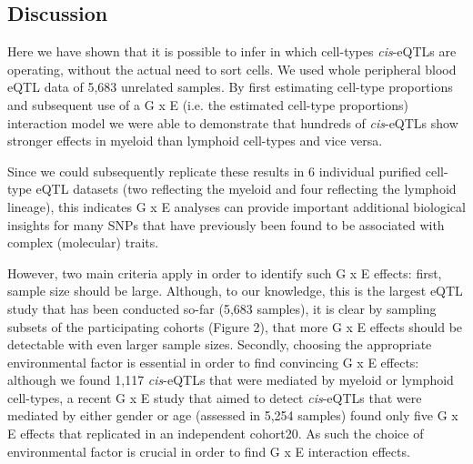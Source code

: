  \subsection{Discussion}
  Here we have shown that it is possible to infer in which cell-types \emph{cis}-eQTLs are operating, without 
  the actual need to sort cells. We used whole peripheral blood eQTL data of 5,683 unrelated samples. 
  By first estimating cell-type proportions and subsequent use of a G x E (i.e. the estimated cell-type 
  proportions) interaction model we were able to demonstrate that hundreds of \emph{cis}-eQTLs show stronger 
  effects in myeloid than lymphoid cell-types and vice versa. 

  Since we could subsequently replicate these results in 6 individual purified cell-type eQTL datasets 
  (two reflecting the myeloid and four reflecting the lymphoid lineage), this indicates G x E analyses 
  can provide important additional biological insights for many SNPs that have previously been found 
  to be associated with complex (molecular) traits. 

  However, two main criteria apply in order to identify such G x E effects: first, sample size should 
  be large. Although, to our knowledge, this is the largest eQTL study that has been conducted so-far 
  (5,683 samples), it is clear by sampling subsets of the participating cohorts (Figure 2), that more 
  G x E effects should be detectable with even larger sample sizes. Secondly, choosing the appropriate 
  environmental factor is essential in order to find convincing G x E effects: although we found 1,117 
  \emph{cis}-eQTLs that were mediated by myeloid or lymphoid cell-types, a recent G x E study that aimed to 
  detect \emph{cis}-eQTLs that were mediated by either gender or age (assessed in 5,254 samples) found only 
  five G x E effects that replicated in an independent cohort20. As such the choice of environmental 
  factor is crucial in order to find G x E interaction effects.

